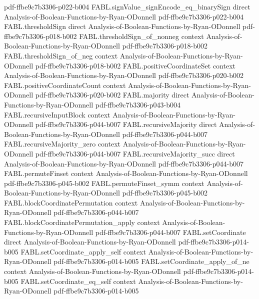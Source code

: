 \begin{theorem}
  {pdf-ffbe9c7b3306-p022-b004}
\proofstep
  {FABL.signValue_signEncode_eq_binarySign}
  {direct}
  {Analysis-of-Boolean-Functions-by-Ryan-ODonnell}
  {pdf-ffbe9c7b3306-p022-b004}
\proofstep
  {FABL.thresholdSign}
  {direct}
  {Analysis-of-Boolean-Functions-by-Ryan-ODonnell}
  {pdf-ffbe9c7b3306-p018-b002}
\proofstep
  {FABL.thresholdSign_of_nonneg}
  {context}
  {Analysis-of-Boolean-Functions-by-Ryan-ODonnell}
  {pdf-ffbe9c7b3306-p018-b002}
\proofstep
  {FABL.thresholdSign_of_neg}
  {context}
  {Analysis-of-Boolean-Functions-by-Ryan-ODonnell}
  {pdf-ffbe9c7b3306-p018-b002}
\proofstep
  {FABL.positiveCoordinateSet}
  {context}
  {Analysis-of-Boolean-Functions-by-Ryan-ODonnell}
  {pdf-ffbe9c7b3306-p020-b002}
\proofstep
  {FABL.positiveCoordinateCount}
  {context}
  {Analysis-of-Boolean-Functions-by-Ryan-ODonnell}
  {pdf-ffbe9c7b3306-p020-b002}
\proofstep
  {FABL.majority}
  {direct}
  {Analysis-of-Boolean-Functions-by-Ryan-ODonnell}
  {pdf-ffbe9c7b3306-p043-b004}
\proofstep
  {FABL.recursiveInputBlock}
  {context}
  {Analysis-of-Boolean-Functions-by-Ryan-ODonnell}
  {pdf-ffbe9c7b3306-p044-b007}
\proofstep
  {FABL.recursiveMajority}
  {direct}
  {Analysis-of-Boolean-Functions-by-Ryan-ODonnell}
  {pdf-ffbe9c7b3306-p044-b007}
\proofstep
  {FABL.recursiveMajority_zero}
  {context}
  {Analysis-of-Boolean-Functions-by-Ryan-ODonnell}
  {pdf-ffbe9c7b3306-p044-b007}
\proofstep
  {FABL.recursiveMajority_succ}
  {direct}
  {Analysis-of-Boolean-Functions-by-Ryan-ODonnell}
  {pdf-ffbe9c7b3306-p044-b007}
\proofstep
  {FABL.permuteFinset}
  {context}
  {Analysis-of-Boolean-Functions-by-Ryan-ODonnell}
  {pdf-ffbe9c7b3306-p045-b002}
\proofstep
  {FABL.permuteFinset_symm}
  {context}
  {Analysis-of-Boolean-Functions-by-Ryan-ODonnell}
  {pdf-ffbe9c7b3306-p045-b002}
\proofstep
  {FABL.blockCoordinatePermutation}
  {context}
  {Analysis-of-Boolean-Functions-by-Ryan-ODonnell}
  {pdf-ffbe9c7b3306-p044-b007}
\proofstep
  {FABL.blockCoordinatePermutation_apply}
  {context}
  {Analysis-of-Boolean-Functions-by-Ryan-ODonnell}
  {pdf-ffbe9c7b3306-p044-b007}
\proofstep
  {FABL.setCoordinate}
  {direct}
  {Analysis-of-Boolean-Functions-by-Ryan-ODonnell}
  {pdf-ffbe9c7b3306-p014-b005}
\proofstep
  {FABL.setCoordinate_apply_self}
  {context}
  {Analysis-of-Boolean-Functions-by-Ryan-ODonnell}
  {pdf-ffbe9c7b3306-p014-b005}
\proofstep
  {FABL.setCoordinate_apply_of_ne}
  {context}
  {Analysis-of-Boolean-Functions-by-Ryan-ODonnell}
  {pdf-ffbe9c7b3306-p014-b005}
\proofstep
  {FABL.setCoordinate_eq_self}
  {context}
  {Analysis-of-Boolean-Functions-by-Ryan-ODonnell}
  {pdf-ffbe9c7b3306-p014-b005}

\end{theorem}
